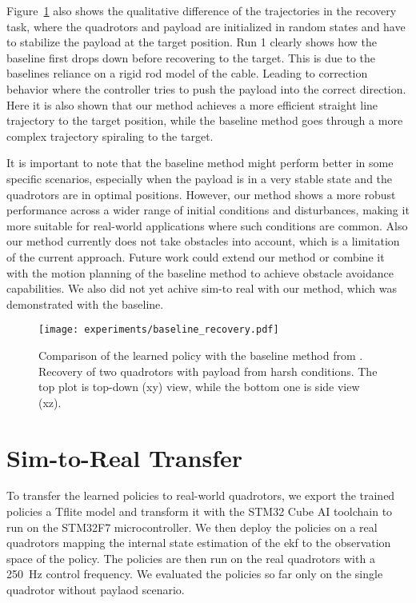Figure~\ref{fig:baseline_recovery} also shows the qualitative difference of the trajectories in the recovery task, where the quadrotors and payload are initialized in random states and have to stabilize the payload at the target position. Run 1 clearly shows how the baseline first drops down before recovering to the target. This is due to the baselines reliance on a rigid rod model of the cable. Leading to correction behavior where the controller tries to push the payload into the correct direction. Here it is also shown that our method achieves a more efficient straight line trajectory to the target position, while the baseline method goes through a more complex trajectory spiraling to the target.

It is important to note that the baseline method might perform better in some specific scenarios, especially when the payload is in a very stable state and the quadrotors are in optimal positions. However, our method shows a more robust performance across a wider range of initial conditions and disturbances, making it more suitable for real-world applications where such conditions are common. Also our method currently does not take obstacles into account, which is a limitation of the current approach. Future work could extend our method or combine it with the motion planning of the baseline method to achieve obstacle avoidance capabilities. We also did not yet achive sim-to real with our method, which was demonstrated with the baseline.

\begin{figure}[H]
    \centering
    
    \texttt{[image: experiments/baseline\_recovery.pdf]}
    \caption[Baseline vs learned two quad recovery]{Comparison of the learned policy with the baseline method from \autocite{Wahba2024}. Recovery of two quadrotors with payload from harsh conditions. The top plot is top-down  (xy) view, while the bottom one is side view (xz).}
    \label{fig:baseline_recovery}
\end{figure}
\section{Sim-to-Real Transfer}
To transfer the learned policies to real-world quadrotors, we export the trained policies a Tflite model and transform it with the STM32 Cube AI toolchain to run on the STM32F7 microcontroller. We then deploy the policies on a real quadrotors mapping the internal state estimation of the \gls{ekf} to the observation space of the policy. The policies are then run on the real quadrotors with a 250~Hz control frequency. We evaluated the policies so far only on the single quadrotor without paylaod scenario. 

